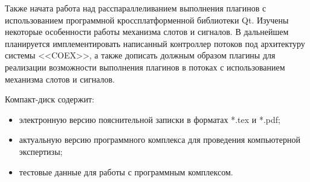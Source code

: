Также начата работа над расспараллеливанием выполнения плагинов с использованием программной кроссплатформенной библиотеки Qt. Изучены некоторые особенности работы механизма слотов и сигналов. В дальнейшем планируется имплементировать написанный контроллер потоков под архитектуру системы <<COEX>>, а также дописать должным образом плагины для реализации возможности выполнения плагинов в потоках с использованием механизма слотов и сигналов.
 
 
 \newpage
 \renewcommand{\refname}{Список использованных источников}
 

 Компакт-диск содержит: 
 \begin{itemize}
 \item электронную версию пояснительной записки в форматах *.tex и *.pdf;
 \item актуальную версию программного комплекса для проведения компьютерной экспертизы;
 \item тестовые данные для работы с программным комплексом.
 \end{itemize}
 
 
 
 
  
 
 


